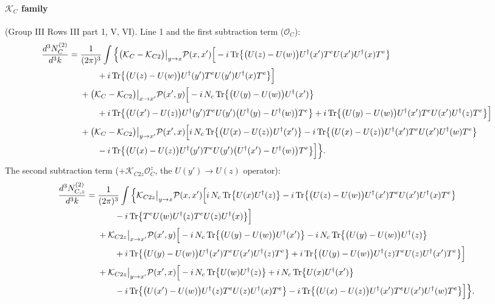 \documentclass[10pt]{article}
\numberwithin{equation}{section}
\newcommand{\PP}{\mathcal P}
\newcommand{\Tr}{{\rm Tr}}
\newcommand{\Ud}{U^\dagger}
\newcommand{\OO}{\mathcal O}
\begin{document}
\paragraph{$\mathcal K_C$ family} (Group III Rows III part 1, V, VI). Line 1 and the first subtraction term ($\OO_C$):
\begin{align}
\frac{d^3N^{(2)}_{C}}{d^3k}={}&\frac{1}{(2\pi)^3}\int\Big\{\big(\mathcal K_C-\mathcal K_{C2}\big)\big|_{y\to x}\PP(x,x')\Big[-i\,\Tr\big\{\big(U(z)-U(w)\big)\Ud(x')T^eU(x')\Ud(x)T^e\big\}\notag\\
&\qquad+i\,\Tr\big\{\big(U(z)-U(w)\big)\Ud(y')T^eU(y')\Ud(x)T^e\big\}\Big]\notag\\
&+\big(\mathcal K_C-\mathcal K_{C2}\big)\big|_{x\to x'}\PP(x',y)\Big[-i\,N_c\,\Tr\big\{\big(U(y)-U(w)\big)\Ud(x')\big\}\notag\\
&\qquad+i\,\Tr\big\{\big(U(x')-U(z)\big)\Ud(y')T^eU(y')\big(\Ud(y)-\Ud(w)\big)T^e\big\}+i\,\Tr\big\{\big(U(y)-U(w)\big)\Ud(x')T^eU(x')\Ud(z)T^e\big\}\Big]\notag\\
&+\big(\mathcal K_C-\mathcal K_{C2}\big)\big|_{y\to x'}\PP(x',x)\Big[i\,N_c\,\Tr\big\{\big(U(x)-U(z)\big)\Ud(x')\big\}-i\,\Tr\big\{\big(U(x)-U(z)\big)\Ud(x')T^eU(x')\Ud(w)T^e\big\}\notag\\
&\qquad-i\,\Tr\big\{\big(U(x)-U(z)\big)\Ud(y')T^eU(y')\big(\Ud(x')-\Ud(w)\big)T^e\big\}\Big]\Big\}.
\end{align}
The second subtraction term ($+\mathcal K_{C2z}\OO_C^z$, the $U(y')\to U(z)$ operator):
\begin{align}
\frac{d^3N^{(2)}_{C,z}}{d^3k}={}&\frac{1}{(2\pi)^3}\int\Big\{\mathcal K_{C2z}\big|_{y\to x}\PP(x,x')\Big[i\,N_c\,\Tr\big\{U(x)\Ud(z)\big\}-i\,\Tr\big\{\big(U(z)-U(w)\big)\Ud(x')T^eU(x')\Ud(x)T^e\big\}\notag\\
&\qquad-i\,\Tr\big\{T^eU(w)\Ud(z)T^eU(z)\Ud(x)\big\}\Big]\notag\\
&+\mathcal K_{C2z}\big|_{x\to x'}\PP(x',y)\Big[-i\,N_c\,\Tr\big\{\big(U(y)-U(w)\big)\Ud(x')\big\}-i\,N_c\,\Tr\big\{\big(U(y)-U(w)\big)\Ud(z)\big\}\notag\\
&\qquad+i\,\Tr\big\{\big(U(y)-U(w)\big)\Ud(x')T^eU(x')\Ud(z)T^e\big\}+i\,\Tr\big\{\big(U(y)-U(w)\big)\Ud(z)T^eU(z)\Ud(x')T^e\big\}\Big]\notag\\
&+\mathcal K_{C2z}\big|_{y\to x'}\PP(x',x)\Big[-i\,N_c\,\Tr\big\{U(w)\Ud(z)\big\}+i\,N_c\,\Tr\big\{U(x)\Ud(x')\big\}\notag\\
&\qquad-i\,\Tr\big\{\big(U(x')-U(w)\big)\Ud(z)T^eU(z)\Ud(x)T^e\big\}-i\,\Tr\big\{\big(U(x)-U(z)\big)\Ud(x')T^eU(x')\Ud(w)T^e\big\}\Big]\Big\}.
\end{align}
\end{document}
